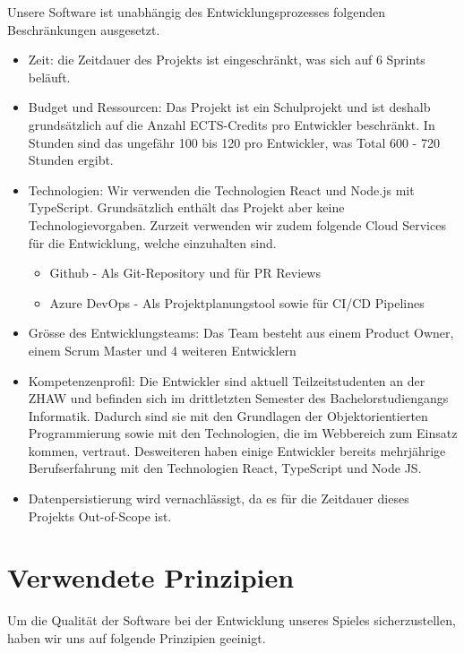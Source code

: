 \documentclass[a4paper, 11pt]{scrartcl}
\let\oldsection\section
\renewcommand\section{\clearpage\oldsection}
\begin{document}
Unsere Software ist unabhängig des Entwicklungsprozesses folgenden Beschränkungen ausgesetzt.
\begin{itemize}
  \item Zeit: die Zeitdauer des Projekts ist eingeschränkt, was sich auf 6 Sprints beläuft.
  \item Budget und Ressourcen: Das Projekt ist ein Schulprojekt und ist deshalb grundsätzlich auf die Anzahl ECTS-Credits pro Entwickler beschränkt. In Stunden sind das ungefähr 100 bis 120 pro Entwickler, was Total 600 - 720 Stunden ergibt.
  \item Technologien: Wir verwenden die Technologien React und Node.js mit TypeScript. Grundsätzlich enthält das Projekt aber keine Technologievorgaben. Zurzeit verwenden wir zudem folgende Cloud Services für die Entwicklung, welche einzuhalten sind.
        \begin{itemize}
          \item Github - Als Git-Repository und für PR Reviews
          \item Azure DevOps - Als Projektplanungstool sowie für CI/CD Pipelines
        \end{itemize}
  \item Grösse des Entwicklungsteams: Das Team besteht aus einem Product Owner, einem Scrum Master und 4 weiteren Entwicklern
  \item Kompetenzenprofil: Die Entwickler sind aktuell Teilzeitstudenten an der ZHAW und befinden sich im drittletzten Semester des Bachelorstudiengangs Informatik. Dadurch sind sie mit den Grundlagen der Objektorientierten Programmierung sowie mit den Technologien, die im Webbereich zum Einsatz kommen, vertraut. Desweiteren haben einige Entwickler bereits mehrjährige Berufserfahrung mit den Technologien React, TypeScript und Node JS.
  \item Datenpersistierung wird vernachlässigt, da es für die Zeitdauer dieses Projekts Out-of-Scope ist.
\end{itemize}

\section{Verwendete Prinzipien}
Um die Qualität der Software bei der Entwicklung unseres Spieles sicherzustellen, haben wir uns auf folgende Prinzipien geeinigt.
\end{document}
